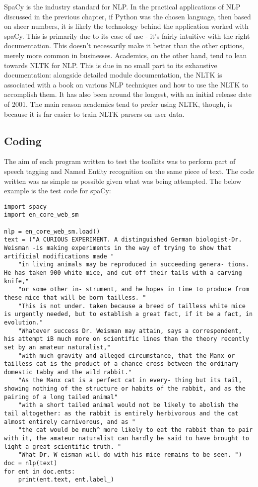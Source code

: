 \documentclass[11pt,a4paper]{book}
\begin{document}
SpaCy is the industry standard for NLP. In the practical applications of NLP discussed in the previous chapter, if Python was the chosen language, then based on sheer numbers, it is likely the technology behind the application worked with spaCy\cite{spacy_morepop}. This is primarily due to its ease of use - it's fairly intuitive with the right documentation. This doesn't necessarily make it better than the other options, merely more common in businesses. Academics, on the other hand, tend to lean towards NLTK for NLP. This is due in no small part to its exhaustive documentation: alongside detailed module documentation, the NLTK is associated with a book\cite{bird_1._2015} on various NLP techniques and how to use the NLTK to accomplish them. It has also been around the longest, with an initial release date of 2001. The main reason academics tend to prefer using NLTK, though, is because it is far easier to train NLTK parsers on user data\cite{spacy_vs_nltk}.

\subsection{Coding}
The aim of each program written to test the toolkits was to perform part of speech tagging and Named Entity recognition on the same piece of text. The code written was as simple as possible given what was being attempted. The below example is the test code for spaCy: 

\begin{lstlisting}[caption={SpaCy Test Code}]
import spacy
import en_core_web_sm

nlp = en_core_web_sm.load()
text = ("A CURIOUS EXPERIMENT. A distinguished German biologist-Dr. Weisman -is making experiments in the way of trying to show that artificial modifications made "
	"in living animals may be reproduced in succeeding genera- tions. He has taken 900 white mice, and cut off their tails with a carving knife," 
	"or some other in- strument, and he hopes in time to produce from these mice that will be born tailless. "
	"This is not under. taken because a breed of tailless white mice is urgently needed, but to establish a great fact, if it be a fact, in evolution."
	"Whatever success Dr. Weisman may attain, says a correspondent, his attempt iB much more on scientific lines than the theory recently set by an amateur naturalist,"
	"with much gravity and alleged circumstance, that the Manx or tailless cat is the product of a chance cross between the ordinary domestic tabby and the wild rabbit."
	"As the Manx cat is a perfect cat in every- thing but its tail, showing nothing of the structure or habits of the rabbit, and as the pairing of a long tailed animal"
	"with a short tailed animal would not be likely to abolish the tail altogether: as the rabbit is entirely herbivorous and the cat almost entirely carnivorous, and as "
	"the cat would be much^ more likely to eat the rabbit than to pair with it, the amateur naturalist can hardly be said to have brought to light a great scientific truth. "
	"What Dr. W eisman will do with his mice remains to be seen. ")
doc = nlp(text)
for ent in doc.ents:
	print(ent.text, ent.label_)
\end{lstlisting}
\end{document}
